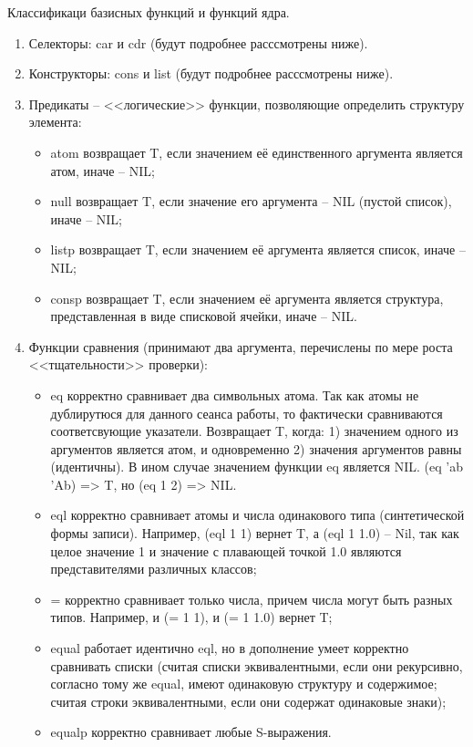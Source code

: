 \documentclass{article}
\begin{document}
Классификаци базисных функций и функций ядра.

\begin{enumerate}
	\item Селекторы: car и cdr (будут подробнее расссмотрены ниже).
	\item Конструкторы: cons и list (будут подробнее расссмотрены ниже).
	\item Предикаты -- <<логические>> функции, позволяющие определить структуру элемента:
	\begin{itemize}
		\item atom возвращает T, если значением её единственного аргумента является атом, иначе -- NIL;
		\item null возвращает T, если значение его аргумента -- NIL (пустой список), иначе -- NIL;
		\item listp возвращает T, если значением её аргумента является список, иначе -- NIL;
		\item consp возвращает T, если значением её аргумента является структура, представленная в виде списковой ячейки, иначе -- NIL. 
	\end{itemize}
	\item Функции сравнения (принимают два аргумента, перечислены по мере роста <<тщательности>> проверки):
	\begin{itemize}
		\item eq корректно сравнивает два символьных атома. Так как атомы не дублирутюся для данного сеанса работы, то фактически сравниваются соответсвующие указатели. 
		Возвращает T, когда: 1) значением одного из аргументов является атом, и одновременно 2) значения аргументов равны (идентичны). В ином случае значением функции eq является NIL. (eq  'ab 'Ab) => T, но (eq 1 2) => NIL.
		\item eql корректно сравнивает атомы и числа одинакового типа (синтетической формы записи). Например, (eql 1 1) вернет T, а (eql 1 1.0) -- Nil, так как целое значение 1 и значение с плавающей точкой 1.0 являются представителями различных классов;
		\item = корректно сравнивает только числа, причем числа могут быть разных типов. Например, и (= 1 1), и (= 1 1.0) вернет T;
		\item equal работает идентично eql, но в дополнение умеет корректно сравнивать списки (считая списки эквивалентными, если они рекурсивно, согласно тому же equal, имеют одинаковую структуру и содержимое; считая строки эквивалентными, если они содержат одинаковые знаки);
		\item equalp корректно сравнивает любые S-выражения. 
	\end{itemize}
\end{enumerate}
	
\end{document}

